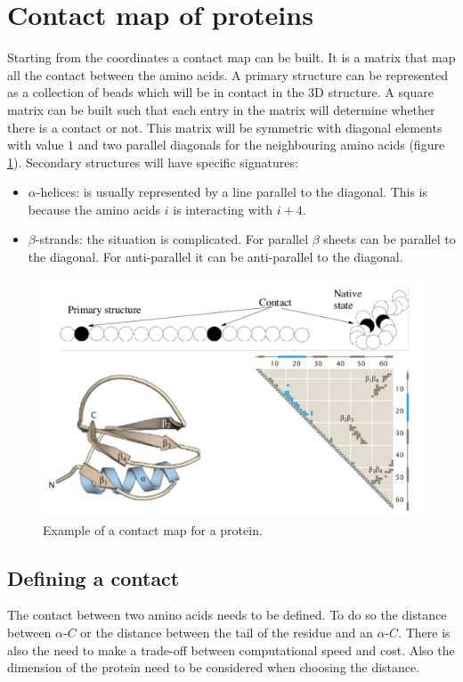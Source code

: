 \section{Contact map of proteins}
Starting from the coordinates a contact map can be built.
It is a matrix that map all the contact between the amino acids.
A primary structure can be represented as a collection of beads which will be in contact in the 3D structure.
A square matrix can be built such that each entry in the matrix will determine whether there is a contact or not.
This matrix will be symmetric with diagonal elements with value $1$ and two parallel diagonals for the neighbouring amino acids (figure \ref{fig:contact}).
Secondary structures will have specific signatures:

\begin{multicols}{2}
	\begin{itemize}
		\item $\alpha$-helices: is usually represented by a line parallel to the diagonal.
			This is because the amino acids $i$ is interacting with $i+4$.
		\item $\beta$-strands: the situation is complicated.
			For parallel $\beta$ sheets can be parallel to the diagonal.
			For anti-parallel it can be anti-parallel to the diagonal.
	\end{itemize}
\end{multicols}


\begin{figure}[H]
			\centering
			\includegraphics[width=\textwidth]{contact.png}
			\caption{Example of a contact map for a protein.}
			\label{fig:contact}
			\end{figure}


	\subsection{Defining a contact}
	The contact between two amino acids needs to be defined.
	To do so the distance between $\alpha$-$C$ or the distance between the tail of the residue and an $\alpha$-$C$.
	There is also the need to make a trade-off between computational speed and cost.
	Also the dimension of the protein need to be considered when choosing the distance.

